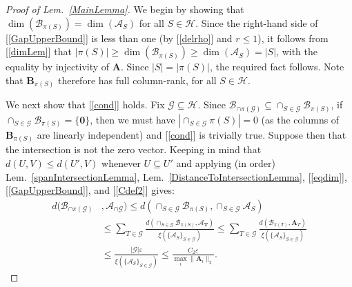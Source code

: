\documentclass[9pt,twocolumn]{pnas-new}
\renewcommand{\eqref}[1]{\textnormal{[\ref{#1}]}}
\begin{document}
\begin{proof}[Proof of Lem.~\ref{MainLemma}]

We begin by showing that $\dim(\bm{\mathcal{B}}_{\pi(S)}) = \dim(\bm{\mathcal{A}}_S)$ for all $S \in \mathcal{H}$. Since the right-hand side of \eqref{GapUpperBound} is less than one (by \eqref{delrho} and $r \leq 1$), it follows from \eqref{dimLem} that $|\pi(S)| \geq \dim(\bm{\mathcal{B}}_{\pi(S)}) \geq \dim(\bm{\mathcal{A}}_S) = |S|$, with the equality by injectivity of $\mathbf{A}$. Since $|S| = |\pi(S)|$, the required fact follows. Note that $\mathbf{B}_{\pi(S)}$ therefore has full column-rank, for all $S \in \mathcal{H}$.

We next show that \eqref{cond} holds.  Fix $\mathcal{G} \subseteq \mathcal{H}$. Since $\bm{\mathcal{B}}_{\cap \pi(\mathcal{G})} \subseteq \cap_{S \in \mathcal{G}} \bm{\mathcal{B}}_{\pi(S)}$, if $\cap_{S \in \mathcal{G}} \bm{\mathcal{B}}_{\pi(S)} = \{\textbf{0}\}$, then we must have $|\cap_{S \in \mathcal{G}} \pi(S)| = 0$ (as the columns of $\mathbf{B}_{\pi(S)}$ are linearly independent) and \eqref{cond} is trivially true. Suppose then that the intersection is not the zero vector. Keeping in mind that $d(U,V) \leq d(U',V)$ whenever $U \subseteq U'$ and applying (in order) Lem.~\ref{spanIntersectionLemma}, Lem.~\ref{DistanceToIntersectionLemma}, \eqref{eqdim}, \eqref{GapUpperBound}, and \eqref{Cdef2} gives:
\begin{align}\label{randoml}
d(\bm{\mathcal{B}}_{\cap \pi(\mathcal{G})}&, \bm{\mathcal{A}}_{\cap \mathcal{G}}  ) 
\leq d\left( \cap_{S \in \mathcal{G}} \bm{\mathcal{B}}_{\pi(S)}, \cap_{S \in \mathcal{G}} \bm{\mathcal{A}}_S \right) \nonumber \\
&\leq \sum_{T \in \mathcal{G}} \frac{ d\left( \cap_{S \in \mathcal{G}} \bm{\mathcal{B}}_{\pi(S)},\bm{\mathcal{A}_{T}} \right) }{ \xi(  \{\bm{\mathcal{A}}_S\}_{S \in \mathcal{G}}) }
\leq \sum_{T \in \mathcal{G}} \frac{ d\left( \bm{\mathcal{B}}_{\pi(T)},\bm{\mathbf{A}}_{T} \right) }{ \xi( \{\bm{\mathcal{A}}_S\}_{S \in \mathcal{G}}) }\nonumber \\
&\leq \frac{|\mathcal{G}| \varepsilon}{\xi( \{\bm{\mathcal{A}}_S\}_{S \in \mathcal{G}})} 
\leq \frac{C_2 \varepsilon}{\max_i\|\mathbf{A}_i\|_2}. 
\end{align}


\end{proof}
\end{document}
